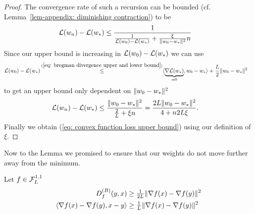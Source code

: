 \begin{proof}
	The convergence rate of such a recursion can be bounded (cf.
	Lemma~\ref{lem-appendix: diminishing contraction}) to be 
	\begin{align*}
		\mathcal{L}(w_n)-\mathcal{L}(w_*)
		&\le \frac{1}{
			\frac{1}{\mathcal{L}(w_0)-\mathcal{L}(w_*)} + \tfrac{\xi}{\|w_0-w_*\|^2}n
		}
	\end{align*}
	Since our upper bound is increasing in \(\mathcal{L}(w_0)-\mathcal{L}(w_*)\)
	we can use
	\begin{align}\label{eq: weights bound loss}
		\Loss(\weights_0) - \Loss(\minimum)
		&\xle{(\ref{eq: bregman divergence upper and lower bound})}
		\langle\underbrace{\nabla\Loss(\minimum)}_{=0}, \weights_0 - \minimum\rangle
		+\frac{\ubound}{2}\|\weights_0-\minimum\|^2
	\end{align}
	to get an upper bound only dependent on \(\|w_0 - w_*\|^2\)
	\begin{align*}
		\mathcal{L}(w_n)-\mathcal{L}(w_*)
		&\le \frac{\|w_0-w_*\|^2}{
			\frac{2}{L} + \xi n
		}
		= \frac{2L\|w_0-w_*\|^2}{
			4 + n 2L \xi
		}.
	\end{align*}
	Finally we obtain (\ref{eq: convex function loss upper bound}) using our
	definition of \(\xi\).
\end{proof}
%
Now to the Lemma we promised to ensure that our weights do not move further away
from the minimum.
%
\begin{lemma}\label{lem: bermanDiv lower bound}
	Let \(f\in\mathcal{F}^{1,1}_{L}\)
	\begin{subequations}
	\begin{align}
		D^{(B)}_{f}(y,x)
		&\ge \tfrac{1}{2L}\|\nabla f(x) - \nabla f(y)\|^2\\
		\label{eq: bregmanDiv lower bound b}
		\langle \nabla f(x) - \nabla f(y), x-y\rangle
		&\ge \tfrac{1}{L}\|\nabla f(x) - \nabla f(y)\|^2
	\end{align}	
	\end{subequations}	
\end{lemma}
